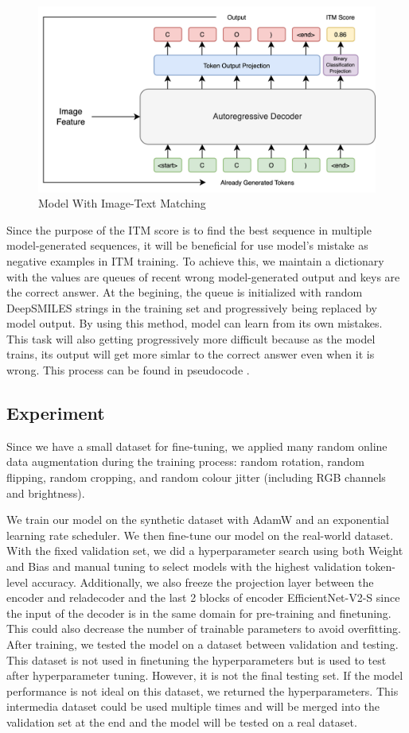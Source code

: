 \documentclass{article}
\begin{document}
\begin{figure}
    \centering
    \includegraphics[width=0.5\linewidth]{itm.drawio.png}
    \caption{Model With Image-Text Matching}
    \label{fig:itm}
\end{figure}
Since the purpose of the ITM score is to find the best sequence in multiple model-generated sequences, it will be beneficial for use model's mistake as negative examples in ITM training. To achieve this, we maintain a dictionary with the values are queues of recent wrong model-generated output and keys are the correct answer. At the begining, the queue is initialized with random DeepSMILES strings in the training set and progressively being replaced by model output. By using this method, model can learn from its own mistakes. This task will also getting progressively more difficult because as the model trains, its output will get more simlar to the correct answer even when it is wrong. This process can be found in pseudocode .   

\subsection{Experiment}

Since we have a small dataset for fine-tuning, we applied many random online data augmentation during the training process: random rotation, random flipping, random cropping,  and random colour jitter (including RGB channels and brightness). 

We train our model on the synthetic dataset with AdamW \autocite{adamw} and an exponential learning rate scheduler. We then fine-tune our model on the real-world dataset. With the fixed validation set, we did a hyperparameter search using both Weight and Bias \autocite{wandb} and manual tuning to select models with the highest validation token-level accuracy.  
Additionally, we also freeze the projection layer between the encoder and reladecoder and the last 2 blocks of encoder EfficientNet-V2-S since the input of the decoder is in the same domain for pre-training and finetuning. This could also decrease the number of trainable parameters to avoid overfitting. 
After training, we tested the model on a dataset between validation and testing. This dataset is not used in finetuning the hyperparameters but is used to test after hyperparameter tuning. However, it is not the final testing set. If the model performance is not ideal on this dataset, we returned the hyperparameters. This intermedia dataset could be used multiple times and will be merged into the validation set at the end and the model will be tested on a real dataset.
\end{document}
